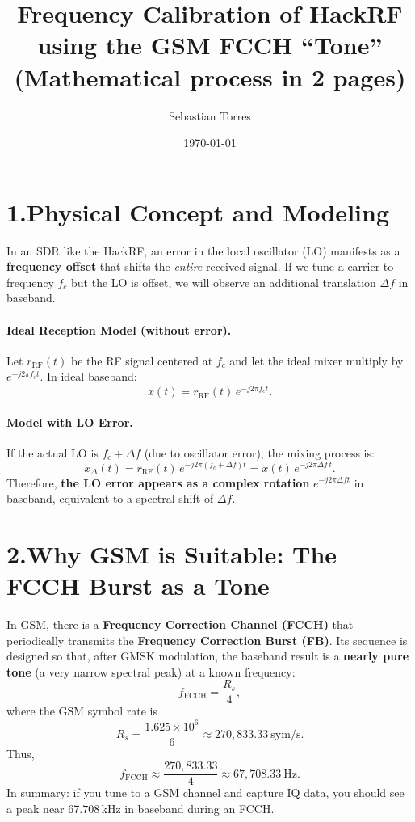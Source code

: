 \documentclass[10pt]{article}
\title{\vspace{-1.0em}Frequency Calibration of HackRF using the GSM FCCH ``Tone''\\(Mathematical process in 2 pages)}
\author{Sebastian Torres}
\date{\vspace{-0.6em}\today}
\begin{document}
\maketitle
\vspace{-0.6em}

\section*{1.\;Physical Concept and Modeling}
In an SDR like the HackRF, an error in the local oscillator (LO) manifests as a \textbf{frequency offset} that shifts the \emph{entire} received signal. If we tune a carrier to frequency $f_c$ but the LO is offset, we will observe an additional translation $\Delta f$ in baseband.

\paragraph{Ideal Reception Model (without error).}
Let $r_{\text{RF}}(t)$ be the RF signal centered at $f_c$ and let the ideal mixer multiply by $e^{-j2\pi f_c t}$. In ideal baseband:
\begin{equation}
x(t) = r_{\text{RF}}(t)\, e^{-j2\pi f_c t}.
\end{equation}

\paragraph{Model with LO Error.}
If the actual LO is $f_c+\Delta f$ (due to oscillator error), the mixing process is:
\begin{equation}
x_\Delta(t) = r_{\text{RF}}(t)\, e^{-j2\pi (f_c+\Delta f) t}
= x(t)\, e^{-j2\pi \Delta f\, t}.
\label{eq:baseband_with_offset}
\end{equation}
Therefore, \textbf{the LO error appears as a complex rotation} $e^{-j2\pi\Delta f t}$ in baseband, equivalent to a spectral shift of $\Delta f$.

\section*{2.\;Why GSM is Suitable: The FCCH Burst as a Tone}
In GSM, there is a \textbf{Frequency Correction Channel (FCCH)} that periodically transmits the \textbf{Frequency Correction Burst (FB)}. Its sequence is designed so that, after GMSK modulation, the baseband result is a \textbf{nearly pure tone} (a very narrow spectral peak) at a known frequency:
\begin{equation}
f_{\text{FCCH}} = \frac{R_s}{4},
\end{equation}
where the GSM symbol rate is
\begin{equation}
R_s=\frac{1.625\times 10^6}{6}\approx 270{,}833.33\ \text{sym/s}.
\end{equation}
Thus,
\begin{equation}
f_{\text{FCCH}} \approx \frac{270{,}833.33}{4} \approx 67{,}708.33\ \text{Hz}.
\label{eq:fcch_freq}
\end{equation}
In summary: if you tune to a GSM channel and capture IQ data, you should see a peak near $67.708\,$kHz in baseband during an FCCH.
\end{document}

